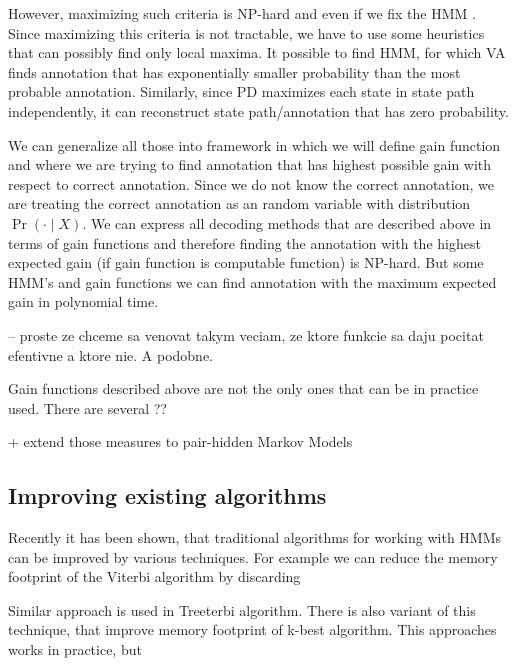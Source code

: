 However, maximizing such criteria is NP-hard \cite{???} and even if we fix the
HMM \cite{Brejova2005}. Since maximizing this criteria is not tractable, we have
to use some heuristics that can possibly find only local maxima. It possible to
find HMM, for which VA finds annotation that has exponentially smaller
probability than the most probable annotation. Similarly, since PD maximizes
each state in state path independently, it can reconstruct state path/annotation
that has zero probability.

We can generalize all those into framework in which we will define gain function
and where we are trying to find annotation that has highest possible gain with
respect to correct annotation. Since we do not know the correct annotation, we
are treating the correct annotation as an random variable with distribution
$\Pr\left(\cdot\mid X\right)$. We can express all decoding methods that are
described above in terms of gain functions and therefore finding the annotation
with the highest expected gain (if gain function is computable function) is
NP-hard. But some HMM's and gain functions we can find annotation with the
maximum expected gain in polynomial time. 

-- proste ze chceme sa venovat takym veciam, ze ktore funkcie sa daju pocitat
efentivne a ktore nie. A podobne.

Gain functions described above are not the only ones that can be in practice
used. There are several ??

+ extend those measures to pair-hidden Markov Models


%

\subsection{Improving existing algorithms}

Recently it has been shown, that traditional algorithms for working with HMMs
can be improved by various techniques. For example we can reduce the memory
footprint of the Viterbi algorithm by discarding 

Similar approach is used in Treeterbi algorithm. There is also variant of this
technique, that improve memory footprint of k-best algorithm. This approaches
works in practice, but 

